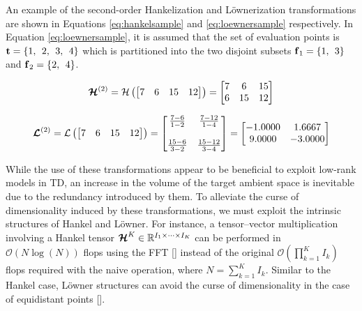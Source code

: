 \documentclass[sensors,article,submit,moreauthors,pdftex]{Definitions/mdpi}
\newcommand{\mathvec}[1]{\boldsymbol{\mathbf{\MakeLowercase{#1}}}}
\newcommand{\mathten}[1]{\boldsymbol{\mathbf{\mathcal{\MakeUppercase{#1}}}}}
\begin{document}
An example of the second-order Hankelization and  L{\"o}wnerization transformations are shown in Equations \ref{eq:hankelsample} and \ref{eq:loewnersample} respectively. In Equation \ref{eq:loewnersample}, it is assumed that the set of evaluation points is $\mathvec{t}=\{1,\:\:2,\:\:3,\:\:4\}$ which is partitioned into the two disjoint subsets $\mathvec{f}_1=\{1,\:\:3\}$ and $\mathvec{f}_2=\{2,\:\:4\}$.

\begin{equation}
	\mathten{H}^{(2)} = \mathcal{H}\left(
	\begin{bmatrix}
		7 & 6 & 15 & 12
	\end{bmatrix}
	\right) =
	\begin{bmatrix}
	7 & 6 & 15 \\
	6 & 15 & 12
	\end{bmatrix}
	\label{eq:hankelsample}
\end{equation}

\begin{equation}
	\mathten{L}^{(2)} = \mathcal{L}\left(
	\begin{bmatrix}
	7 & 6 & 15 & 12
	\end{bmatrix}
	\right) = 
	\begin{bmatrix}
	\frac{7-6}{1-2} &  \frac{7-12}{1-4} \\
	\\
	 \frac{15-6}{3-2} & \frac{15-12}{3-4}
	\end{bmatrix}
	=
	\begin{bmatrix}
	-1.0000 &  1.6667 \\
	9.0000 & -3.0000
	\end{bmatrix}	
	\label{eq:loewnersample}
\end{equation}

While the use of these transformations appear to be beneficial to exploit low-rank models in TD, an increase in the volume of the target ambient space is inevitable due to the redundancy introduced by them. To alleviate the curse of dimensionality induced by these transformations, we must exploit the intrinsic structures of Hankel and L{\"o}wner. For instance, a tensor–vector multiplication involving a Hankel tensor $\mathten{H}^{K} \in \mathbb{R}^{I_1 \times \cdots \times I_K}$ can be performed in $\mathcal{O}(N \log(N))$ flops using the FFT [] instead of the original $\mathcal{O}(\prod_{k=1}^{K} I_k)$ flops required with the naive operation, where $N=\sum_{k=1}^{K} I_k$. Similar to the Hankel case, L{\"o}wner structures can avoid the curse of dimensionality in the case of equidistant points [].
\end{document}
